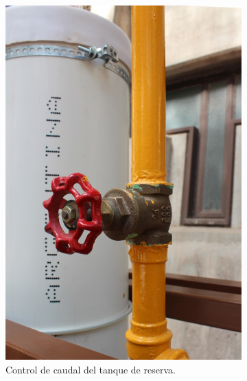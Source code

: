 \begin{figure}[ht]
        \centering
        \begin{subfigure}[b]{0.36\textwidth}
\includegraphics[width=\textwidth]{Cap2-DisenoEnsamblado/images/valvTanque.JPG}
                \caption{Control de caudal del tanque de reserva.}
                \label{fig:valvTanque}
        \end{subfigure}
        \hfill
        \begin{subfigure}[b]{0.36\textwidth}

\end{subfigure}
\end{figure}
